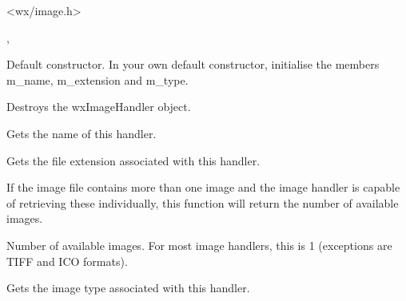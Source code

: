 
<wx/image.h>


, 


\label{wximagehandlerconstr}


Default constructor. In your own default constructor, initialise the members
m\_name, m\_extension and m\_type.



Destroys the wxImageHandler object.



Gets the name of this handler.



Gets the file extension associated with this handler.

\label{wximagehandlergetimagecount}


If the image file contains more than one image and the image handler is capable 
of retrieving these individually, this function will return the number of
available images.



Number of available images. For most image handlers, this is 1 (exceptions
are TIFF and ICO formats).



Gets the image type associated with this handler.


